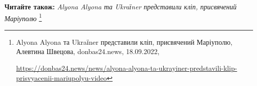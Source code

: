  
 
 
 
 

\textbf{Читайте також:} \emph{Alyona Alyona та Ukraїner представили кліп, присвячений Маріуполю}%
\footnote{Alyona Alyona та Ukraїner представили кліп, присвячений Маріуполю, Алевтина Швецова, donbas24.news, 18.09.2022, \par%
\url{https://donbas24.news/news/alyona-alyona-ta-ukrayiner-predstavili-klip-prisvyacenii-mariupolyu-video}%
}
